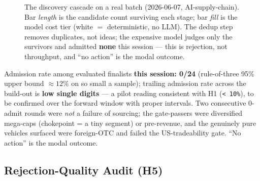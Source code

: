 \documentclass[11pt]{article}
\begin{document}
\begin{figure}[t]
\caption{The discovery cascade on a real batch (2026-06-07, AI-supply-chain). Bar
\emph{length} is the candidate count surviving each stage; bar \emph{fill} is the
model cost tier (white $=$ deterministic, no LLM). The dedup step removes
duplicates, not ideas; the expensive model judges only the survivors and admitted
\textbf{none} this session --- this is rejection, not throughput, and ``no action''
is the modal outcome.}
\label{fig:cascade}
\end{figure}

Admission rate among evaluated finalists \textbf{this session: 0/24}
(rule-of-three 95\% upper bound $\approx 12\%$ on so small a sample); trailing
admission rate across the build-out is \textbf{low single digits} --- a pilot
reading consistent with H1 (\texttt{< 10\%}), to be confirmed over the forward
window with proper intervals.
Two consecutive 0-admit rounds were \emph{not} a failure of sourcing; the
gate-passers were diversified mega-caps (chokepoint = a tiny segment) or
pre-revenue, and the genuinely pure vehicles surfaced were foreign-OTC and
failed the US-tradeability gate.
``No action'' is the modal outcome.

\subsection{Rejection-Quality Audit (H5)}
\end{document}
